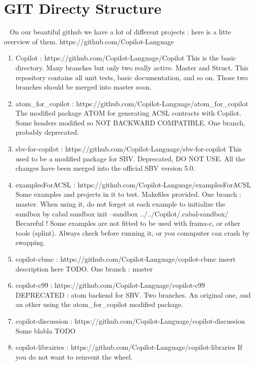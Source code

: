 \section{GIT Directy Structure}~\label{sec:GIT}
On our beautiful github we have a lot of different projects : here is a litte overview of them.
https://github.com/Copilot-Language

\begin{enumerate}
\item Copilot : https://github.com/Copilot-Language/Copilot   This is the basic directory. Many branches but only two really active. Master and Struct. This repository contains all unit tests, basic documentation, and so on. Those two branches should be merged into master soon.
\item atom\_for\_copilot : https://github.com/Copilot-Language/atom\_for\_copilot   The modified package ATOM for generating ACSL contracts with Copilot. Some headers modified so NOT BACKWARD COMPATIBLE. One branch, probably deprecated.
\item sbv-for-copilot : https://github.com/Copilot-Language/sbv-for-copilot This used to be a modified package for SBV. Deprecated, DO NOT USE. All the changes have been merged into the official SBV version 5.0.
\item examplesForACSL : https://github.com/Copilot-Language/examplesForACSL  Some examples and projects in it to test. Makefiles provided. One branch : master. When using it, do not forget at each example to initialize the sandbox by cabal sandbox init --sandbox ../../Copilot/.cabal-sandbox/ 
\subitem Becareful ! Some examples are not fitted to be used with frama-c, or other tools (splint). Always check before running it, or you comnputer can crash by swapping.
\item copilot-cbmc : https://github.com/Copilot-Language/copilot-cbmc  insert description here TODO. One branch : master
\item copilot-c99 : https://github.com/Copilot-Language/copilot-c99  DEPRECATED : atom backend for SBV. Two branches. An original one, and an other using the atom\_for\_copilot modified package.
\item copilot-discussion : https://github.com/Copilot-Language/copilot-discussion Some blabla TODO
\item copilot-librairies : https://github.com/Copilot-Language/copilot-libraries  If you do not want to reinvent the wheel. 

\end{enumerate}

